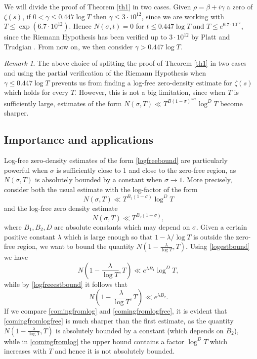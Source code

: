 \documentclass[reqno]{amsart}
\numberwithin{equation}{section}
\theoremstyle{remark}
\newtheorem*{remark}{Remark}
\begin{document}
We will divide the proof of Theorem \ref{th1} in two cases. Given $\rho=\beta+i\gamma$ a zero of $\zeta(s)$, if $0<\gamma\le 0.447\log T$ then $\gamma\le 3\cdot 10^{12}$, since we are working with $T\le \exp(6.7\cdot 10^{12})$. Hence $N(\sigma,t)=0$ for $t\le 0.447\log T$ and $T\le e^{6.7\cdot 10^{12}}$, since the Riemann Hypothesis has been verified up to $3\cdot 10^{12}$ by Platt and Trudgian \cite{platt_riemann_2021}. From now on, we then consider $\gamma>0.447\log T$.  
\begin{remark}
The above choice of splitting the proof of Theorem \ref{th1} in two cases and using the partial verification of the Riemann Hypothesis when $\gamma\le 0.447\log T$ prevents us from finding a log-free zero-density estimate for $\zeta(s)$ which holds for every $T$. However, this is not a big limitation, since when $T$ is sufficiently large, estimates of the form $N(\sigma,T)\ll T^{B(1-\sigma)^{3/2}}\log^{D}T$ become sharper.
\end{remark}
\subsection{Importance and applications}
Log-free zero-density estimates of the form \eqref{logfreebound} are particularly powerful when $\sigma$ is sufficiently close to $1$ and close to the zero-free region, as $N(\sigma,T)$ is absolutely bounded by a constant when $\sigma\rightarrow 1$. More precisely, consider both the usual estimate with the log-factor of the form
\begin{equation}\label{logestbound}
    N(\sigma,T)\ll T^{B_1(1-\sigma)}\log^DT
\end{equation}
and the log-free zero density estimate 
\begin{equation}\label{logfreeestbound}
    N(\sigma,T)\ll T^{B_2(1-\sigma)},
\end{equation}
where $B_1,B_2,D$ are absolute constants which may depend on $\sigma$. 
Given a certain positive constant $\lambda$ which is large enough so that $1-\lambda/\log T$ is outside the zero-free region, we want to bound the quantity $N\left(1-\frac{\lambda}{\log T},T\right)$. Using \eqref{logestbound} we have
\begin{equation}\label{comingfromlog}
    N\left(1-\frac{\lambda}{\log T},T\right)\ll e^{\lambda B_1}\log^DT,
\end{equation}
while by \eqref{logfreeestbound} it follows that
\begin{equation}\label{comingfromlogfree}
    N\left(1-\frac{\lambda}{\log T},T\right)\ll e^{\lambda B_2}.
\end{equation}
If we compare \eqref{comingfromlog} and \eqref{comingfromlogfree}, it is evident that \eqref{comingfromlogfree} is much sharper than the first estimate, as the quantity $N\left(1-\frac{\lambda}{\log T},T\right)$ is absolutely bounded by a constant (which depends on $B_2$), while in \eqref{comingfromlog} the upper bound contains a factor $\log^D T$ which increases with $T$ and hence it is not absolutely bounded.\\
\end{document}
